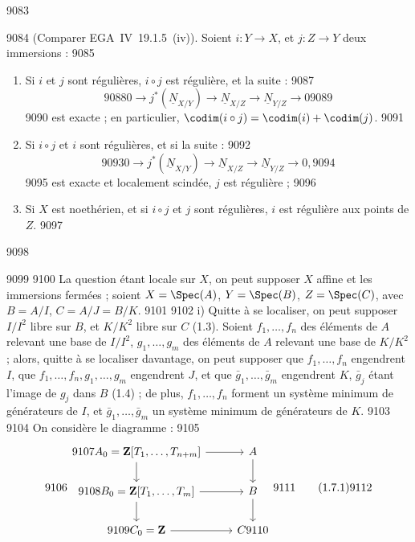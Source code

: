   9083	\begin{proposition}[1.7]
  9084	\textup{(}Comparer EGA~IV~19.1.5~(iv)\textup{)}. Soient $i: Y \to X$, et $j: Z \to Y$ deux immersions :
  9085	\begin{enumerate}[label=\roman*)]
  9086	\item Si $i$ et $j$ sont r\'eguli\`eres, $i \circ j$ est r\'eguli\`ere, et la suite :
  9087	\[
  9088	0 \longrightarrow j^{*}(\underline{N}_{X/Y}) \longrightarrow \underline{N}_{X/Z} \longrightarrow \underline{N}_{Y/Z} \longrightarrow 0
  9089	\]
  9090	est exacte ; en particulier, $\codim(i \circ j) = \codim(i) + \codim(j)$.
  9091	\item Si $i \circ j$ et $i$ sont r\'eguli\`eres, et si la suite :
  9092	\[
  9093	0 \longrightarrow j^{*}(\underline{N}_{X/Y}) \longrightarrow \underline{N}_{X/Z} \longrightarrow \underline{N}_{Y/Z} \longrightarrow 0,
  9094	\]
  9095	est exacte et localement scind\'ee, $j$ est r\'eguli\`ere ;
  9096	\item Si $X$ est noeth\'erien, et si $i \circ j$ et $j$ sont r\'eguli\`eres, $i$ est r\'eguli\`ere aux points de $Z$.
  9097	\end{enumerate}
  9098	\end{proposition}
  9099	
  9100	La question \'etant locale sur $X$, on peut supposer $X$ affine et les immersions ferm\'ees ; soient $X = \Spec(A)$, $Y = \Spec(B)$, $Z = \Spec(C)$, avec $B = A/I$, $C = A/J = B/K$.
  9101	
  9102	i) Quitte \`a se localiser, on peut supposer $I/I^2$ libre sur $B$, et $K/K^2$ libre sur $C$ (1.3). Soient $f_1,\dots,f_n$ des \'el\'ements de $A$ relevant une base de $I/I^2$, $g_1,\dots,g_m$ des \'el\'ements de $A$ relevant une base de $K/K^2$ ; alors, quitte \`a se localiser davantage, on peut supposer que $f_1,\dots,f_n$ engendrent $I$, que $f_1,\dots,f_n,g_1,\dots,g_m$ engendrent $J$, et que $\bar{g}_1,\dots,\bar{g}_m$ engendrent $K$, $\bar{g}_j$ \'etant l'image de $g_j$ dans $B$ (1.4) ; de plus, $f_1,\dots,f_n$ forment un syst\`eme minimum de g\'en\'erateurs de $I$, et $\bar{g}_1,\dots,\bar{g}_m$ un syst\`eme minimum de g\'en\'erateurs de $K$.
  9103	
  9104	On consid\`ere le diagramme :
  9105	\[
  9106	\begin{tikzcd}
  9107	A_0 = \mathbf{Z}[T_1,\dots,T_{n+m}] \arrow[r] \arrow[d] & A \arrow[d] \\
  9108	B_0 = \mathbf{Z}[T_1,\dots,T_m] \arrow[r] \arrow[d] & B \arrow[d] \\
  9109	C_0 = \mathbf{Z} \arrow[r] & C
  9110	\end{tikzcd}
  9111	\tag{1.7.1}
  9112	\]
